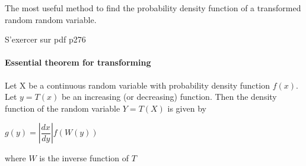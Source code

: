 The most useful method to find the probability density function of a 
transformed random random variable.
\begin{center}
S'exercer sur pdf p276
\end{center}
\paragraph{Essential theorem for transforming}
Let X be a continuous random variable with probability density function 
$f(x)$. Let $y=T(x)$ be an increasing (or decreasing) function.
Then the density function of the random variable $Y = T(X)$ is given by
\begin{center}
$g(y)=\left|\dfrac{dx}{dy}\right|f\left( W(y) \right)$
\end{center}
where $W$ is the inverse function of $T$
